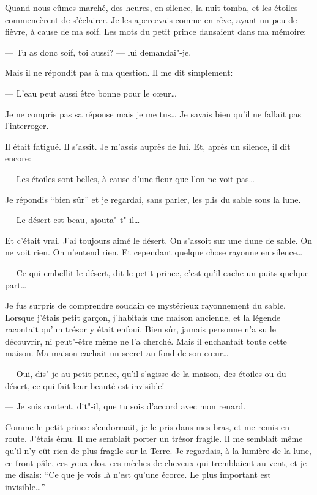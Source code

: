 \begin{Parallel}[p]{}{}
{\medskip

Quand nous eûmes marché, des heures, en silence, la nuit tomba, et les étoiles
commencèrent de s'éclairer. Je les apercevais comme en rêve, ayant un peu de fièvre,
à cause de ma soif. Les mots du petit prince dansaient dans ma mémoire:

--- Tu as donc soif, toi aussi? --- lui demandai"-je.

Mais il ne répondit pas à ma question. Il me dit simplement:

--- L'eau peut aussi être bonne pour le cœur\ldots{}

Je ne compris pas sa réponse mais je me tus\ldots{} Je savais bien qu'il ne fallait
pas l'interroger.

Il était fatigué. Il s'assit. Je m'assis auprès de lui. Et, après un silence, il dit
encore:

--- Les étoiles sont belles, à cause d'une fleur que l'on ne voit pas\ldots{}

Je répondis ``bien sûr'' et je regardai, sans parler, les plis du sable sous la lune.

--- Le désert est beau, ajouta"-t"-il\ldots{}

Et c'était vrai. J'ai toujours aimé le désert. On s'assoit sur une dune de sable. On
ne voit rien. On n'entend rien. Et cependant quelque chose rayonne en silence\ldots{}

--- Ce qui embellit le désert, dit le petit prince, c'est qu'il cache un puits
quelque part\ldots{}

Je fus surpris de comprendre soudain ce mystérieux rayonnement du sable. Lorsque
j'étais petit garçon, j'habitais une maison ancienne, et la légende racontait qu’un
trésor y était enfoui. Bien sûr, jamais personne n'a su le découvrir, ni peut"-être
même ne l'a cherché. Mais il enchantait toute cette maison. Ma maison cachait un
secret au fond de son cœur\ldots{}

--- Oui, dis"-je au petit prince, qu'il s'agisse de la maison, des étoiles ou du
désert, ce qui fait leur beauté est invisible!

--- Je suis content, dit"-il, que tu sois d'accord avec mon renard.

Comme le petit prince s'endormait, je le pris dans mes bras, et me remis en route.
J'étais ému. Il me semblait porter un trésor fragile. Il me semblait même qu'il n'y
eût rien de plus fragile sur la Terre. Je regardais, à la lumière de la lune, ce
front pâle, ces yeux clos, ces mèches de cheveux qui tremblaient au vent, et je me
disais: ``Ce que je vois là n'est qu'une écorce. Le plus important est invisible\ldots{}''

}
\end{Parallel}
